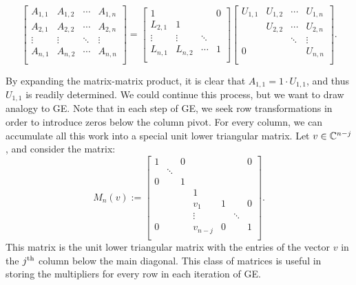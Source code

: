 \begin{equation}
\begin{bmatrix}
A_{1,1} & A_{1,2} & \cdots & A_{1,n}\\
A_{2,1} & A_{2,2} & \cdots & A_{2,n}\\
\vdots & \vdots & \ddots & \vdots\\
A_{n,1} & A_{n,2} & \cdots & A_{n,n}\\
\end{bmatrix}
=
\begin{bmatrix}
1 & & & 0\\
L_{2,1} & 1\\
\vdots & \vdots & \ddots\\
L_{n,1} & L_{n,2} & \cdots & 1\\
\end{bmatrix}
\begin{bmatrix}
U_{1,1} & U_{1,2} & \cdots & U_{1,n}\\
& U_{2,2} & \cdots & U_{2,n}\\
& & \ddots & \vdots\\
0 & & & U_{n,n}\\
\end{bmatrix}.
\end{equation}

By expanding the matrix-matrix product, it is clear that $A_{1,1} = 1\cdot U_{1,1}$, and thus $U_{1,1}$ is readily determined. We could continue this process, but we want to draw analogy to GE. Note that in each step of GE, we seek row transformations in order to introduce zeros below the column pivot. For every column, we can accumulate all this work into a special unit lower triangular matrix. Let $v\in\mathbb{C}^{n-j}$, and consider the matrix:
\begin{equation}
M_n(v) := \begin{bmatrix}
1 & & 0 & & & & 0\\
& \ddots\\
0 & & 1\\
& & & 1\\
& & & v_1 & 1 & & 0\\
& & & \vdots & & \ddots\\
0 & & & v_{n-j} & 0 & & 1\\
\end{bmatrix}.
\end{equation}
This matrix is the unit lower triangular matrix with the entries of the vector $v$ in the $j^{\rm th}$ column below the main diagonal. This class of matrices is useful in storing the multipliers for every row in each iteration of GE.

